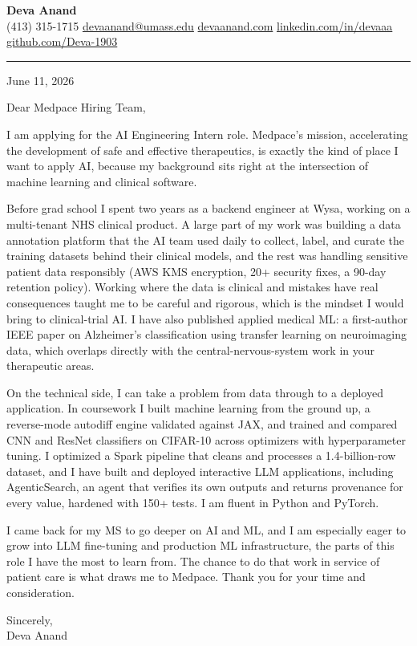 \documentclass[letterpaper,11pt]{article}
\begin{document}
\pagestyle{empty}
\begin{center}
    {\LARGE \bfseries \textcolor{ResumeNavy}{Deva Anand}} \\ \vspace{4pt}
    \small
    (413) 315-1715 \enspace\textbar\enspace
    \href{mailto:devaanand@umass.edu}{devaanand@umass.edu} \enspace\textbar\enspace
    \href{https://devaanand.com}{devaanand.com} \enspace\textbar\enspace
    \href{https://linkedin.com/in/devaaa/}{linkedin.com/in/devaaa} \enspace\textbar\enspace
    \href{https://github.com/Deva-1903}{github.com/Deva-1903}
\end{center}
\vspace{4pt}
\textcolor{ResumeNavy}{\rule{\textwidth}{0.8pt}}
\vspace{2pt}

June 11, 2026

Dear Medpace Hiring Team,

I am applying for the AI Engineering Intern role. Medpace's mission, accelerating the development of safe and effective therapeutics, is exactly the kind of place I want to apply AI, because my background sits right at the intersection of machine learning and clinical software.

Before grad school I spent two years as a backend engineer at Wysa, working on a multi-tenant NHS clinical product. A large part of my work was building a data annotation platform that the AI team used daily to collect, label, and curate the training datasets behind their clinical models, and the rest was handling sensitive patient data responsibly (AWS KMS encryption, 20+ security fixes, a 90-day retention policy). Working where the data is clinical and mistakes have real consequences taught me to be careful and rigorous, which is the mindset I would bring to clinical-trial AI. I have also published applied medical ML: a first-author IEEE paper on Alzheimer's classification using transfer learning on neuroimaging data, which overlaps directly with the central-nervous-system work in your therapeutic areas.

On the technical side, I can take a problem from data through to a deployed application. In coursework I built machine learning from the ground up, a reverse-mode autodiff engine validated against JAX, and trained and compared CNN and ResNet classifiers on CIFAR-10 across optimizers with hyperparameter tuning. I optimized a Spark pipeline that cleans and processes a 1.4-billion-row dataset, and I have built and deployed interactive LLM applications, including AgenticSearch, an agent that verifies its own outputs and returns provenance for every value, hardened with 150+ tests. I am fluent in Python and PyTorch.

I came back for my MS to go deeper on AI and ML, and I am especially eager to grow into LLM fine-tuning and production ML infrastructure, the parts of this role I have the most to learn from. The chance to do that work in service of patient care is what draws me to Medpace. Thank you for your time and consideration.

\vspace{4pt}

Sincerely, \\
Deva Anand
\end{document}
